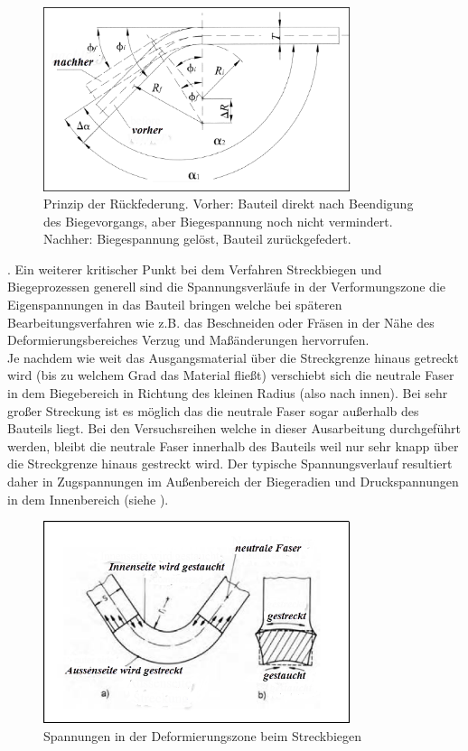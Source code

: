 \documentclass[12pt,a4paper,parskip,twoside,BCOR5mm,headsepline]{scrartcl}
\begin{document}
 \begin{figure}[hbtp]
 \centering
 \includegraphics[width=0.8\textwidth]{springback}
 \caption[Rückfederung]{Prinzip der Rückfederung. Vorher: Bauteil direkt nach Beendigung des Biegevorgangs, aber Biegespannung noch nicht vermindert.
 Nachher: Biegespannung gelöst, Bauteil zurückgefedert.\\\autocite[65]{smfpd}}
 \label{fig:springback}
 \end{figure}

 . 
Ein weiterer kritischer Punkt bei dem Verfahren Streckbiegen und Biegeprozessen generell sind die Spannungsverläufe in der Verformungszone die Eigenspannungen in das Bauteil bringen welche bei späteren Bearbeitungsverfahren wie z.B. das Beschneiden oder Fräsen in der Nähe des Deformierungsbereiches Verzug und Maßänderungen hervorrufen.\\ Je nachdem wie weit das Ausgangsmaterial über die Streckgrenze hinaus getreckt wird (bis zu welchem Grad das Material fließt) verschiebt sich die neutrale Faser in dem Biegebereich in Richtung des kleinen Radius (also nach innen). Bei sehr großer Streckung ist es möglich das die neutrale Faser sogar außerhalb des Bauteils liegt. \autocite[374]{fu} Bei den Versuchsreihen welche in dieser Ausarbeitung durchgeführt werden, bleibt die neutrale Faser innerhalb des Bauteils weil nur sehr knapp über die Streckgrenze hinaus gestreckt wird. Der typische Spannungsverlauf resultiert daher in Zugspannungen im Außenbereich der Biegeradien und Druckspannungen in dem Innenbereich (siehe ).

\begin{figure}[hbtp]
\centering
\includegraphics[width=0.8\textwidth]{neutralefaser}
\caption{Spannungen in der Deformierungszone beim Streckbiegen \autocite[195]{tsch}}
\label{fig:neutralefaser}
\end{figure}
\end{document}
